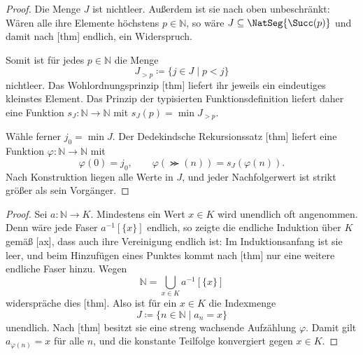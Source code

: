\documentclass[main.tex]{subfiles}
\begin{document}
\begin{proof}
Die Menge \(J\) ist nichtleer. Außerdem ist sie nach oben unbeschränkt:
Wären alle ihre Elemente höchstens \(p\in\mathbb N\), so wäre
\(J\subseteq\NatSeg{\Succ(p)}\) und damit nach
[thm] endlich, ein Widerspruch.

Somit ist für jedes \(p\in\mathbb N\) die Menge
\[
 J_{>p}\coloneqq\{j\in J\mid p<j\}
\]
nichtleer. Das Wohlordnungsprinzip
[thm] liefert ihr jeweils ein
eindeutiges kleinstes Element. Das Prinzip der typisierten
Funktionsdefinition liefert daher eine Funktion
\(s_J\colon\mathbb N\to\mathbb N\) mit
\(s_J(p)=\min J_{>p}\).

Wähle ferner \(j_0=\min J\). Der Dedekindsche Rekursionssatz
[thm] liefert eine Funktion
\(\varphi\colon\mathbb N\to\mathbb N\) mit
\[
 \varphi(0)=j_0,
 \qquad
 \varphi(\Succ(n))=s_J(\varphi(n)).
\]
Nach Konstruktion liegen alle Werte in \(J\), und jeder Nachfolgerwert ist
strikt größer als sein Vorgänger.
\end{proof}

\begin{proof}
Sei \(a\colon\mathbb N\to K\). Mindestens ein Wert \(x\in K\) wird
unendlich oft angenommen. Denn wäre jede Faser \(a^{-1}[\{x\}]\) endlich,
so zeigte die endliche Induktion über \(K\) gemäß
[ax], dass auch ihre Vereinigung
endlich ist: Im Induktionsanfang ist sie leer, und beim Hinzufügen eines
Punktes kommt nach [thm] nur eine weitere endliche
Faser hinzu. Wegen
\[
 \mathbb N=\bigcup_{x\in K}a^{-1}[\{x\}]
\]
widerspräche dies
[thm]. Also ist für ein \(x\in K\) die
Indexmenge
\[
 J\coloneqq\{n\in\mathbb N\mid a_n=x\}
\]
unendlich. Nach
[thm] besitzt sie
eine streng wachsende Aufzählung \(\varphi\). Damit gilt
\(a_{\varphi(n)}=x\) für alle \(n\), und die konstante Teilfolge konvergiert
gegen \(x\in K\).
\end{proof}
\end{document}
